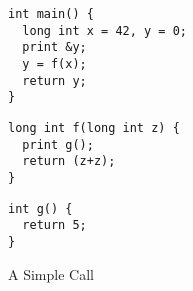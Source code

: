 \begin{figure}[b]
    \begin{minipage}{.35\textwidth}
\begin{verbatim}
int main() {
  long int x = 42, y = 0;
  print &y;
  y = f(x);
  return y;
}
\end{verbatim}
    \end{minipage}
    \begin{minipage}{.35\textwidth}
\begin{verbatim}
long int f(long int z) {
  print g();
  return (z+z);
}
\end{verbatim}
    \end{minipage}
    \begin{minipage}{.25\textwidth}
\begin{verbatim}
int g() {
  return 5;
}
\end{verbatim}
    \end{minipage}
\caption{A Simple Call}
\label{fig:share-program}
\end{figure}


\newcommand{\instrc}{lgray}
\newcommand{\mainsealc}{cyan}
\newcommand{\mainpassc}{magenta}
\newcommand{\fsealc}{green}
\newcommand{\sharec}{lgray}
\newcommand{\unsealc}{gray}
\newcommand{\emptyoutc}{white} %
\newcommand{\fulloutc}{white}

